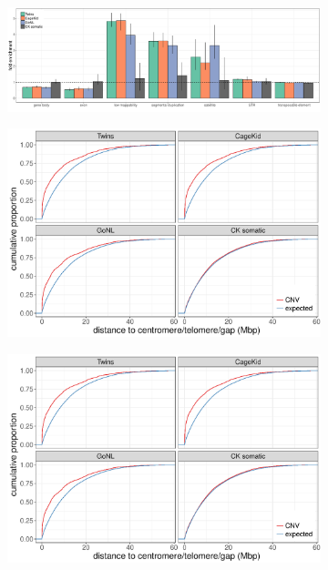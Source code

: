 \begin{figure}[htp]
  \centering
  \begin{subfigure}{.9\textwidth}
    \includegraphics[width=\textwidth,page=2]{figures/PopSV-repeatEnr-long.pdf}
    \caption{}
    \label{fig:repCont}
  \end{subfigure}
  
  \begin{subfigure}{.48\textwidth}
    \includegraphics[width=\textwidth,page=4]{figures/PopSV-repeatEnr.pdf}
    \caption{}
    \label{fig:repSat}
  \end{subfigure}
  \begin{subfigure}{.48\textwidth}
    \includegraphics[width=\textwidth,page=6]{figures/PopSV-repeatEnr.pdf}

\end{subfigure}
\end{figure}
